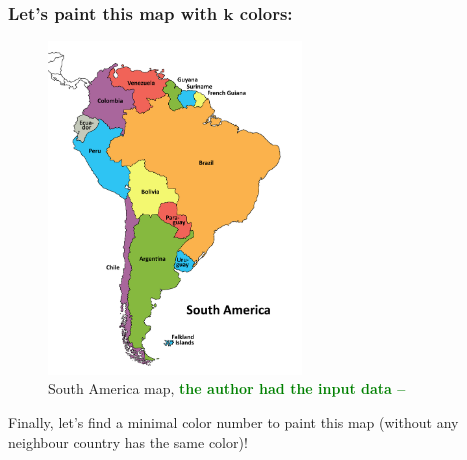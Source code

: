 \documentclass{beamer}
\begin{document}
\begin{frame}[fragile] 

\frametitle{Let's paint this map with \(\textbf{k}\) colors:}
	
\begin{figure}[tbp]
  \centering
    \includegraphics[width=0.6\textwidth , height=0.65\textheight] {south_america.png}
   \caption{South America map, \textcolor{green}{\textbf{the author had the input data --  \Smiley{}}} }
	
\end{figure}
	
\pause
Finally, let's find a minimal color number to paint this map (without any neighbour country has the same color)!

\end{frame}


\end{document}
